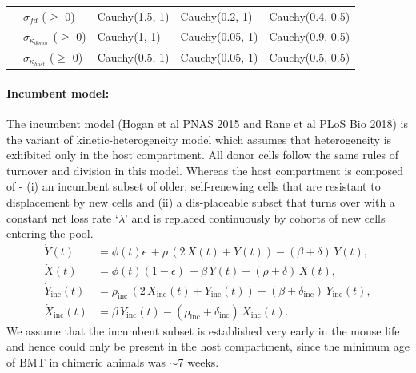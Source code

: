 \documentclass[11pt]{article}
\newcommand{\be}{\begin{equation}}
\newcommand{\ee}{\end{equation}}
\begin{document}
\begin{table}[h!]
\begin{center}
\begin{tabular}{l l l l l }
			&$\sigma_{fd}$ ($\ge$ 0)              & Cauchy(1.5, 1)        & Cauchy(0.2, 1)       &  Cauchy(0.4, 0.5)     \\
			&$\sigma_{\kappa_{donor}}$ ($\ge$ 0)  & Cauchy(1, 1)          & Cauchy(0.05, 1)      &  Cauchy(0.9, 0.5)     \\ 
			&$\sigma_{\kappa_{host}}$ ($\ge$ 0)   & Cauchy(0.5, 1)        & Cauchy(0.05, 1)      &  Cauchy(0.5, 0.5)     \\
			\hline
			\toprule 
		\end{tabular}
	\end{center}
\label{tab:priors_khm}
\end{table} 


\paragraph{Incumbent model:}
The incumbent model (Hogan et al PNAS 2015 and Rane et al PLoS Bio 2018) is the variant of kinetic-heterogeneity model which assumes that heterogeneity is exhibited only in the host compartment.
All donor cells follow the same rules of turnover and division in this model.
Whereas the host compartment is composed of - (i) an incumbent subset of older, self-renewing cells that are resistant to displacement by new cells and (ii) a dis-placeable subset that turns over with a constant net loss rate `$\lambda$' and is replaced continuously by cohorts of new cells entering the pool.
\be
\begin{aligned}
\dot Y(t) &= \phi(t) \epsilon \, + \rho \,(2 \, X(t) + Y(t)) - (\beta + \delta) \, Y(t),\\
\dot X(t) &= \phi(t) (1-\epsilon) \, + \beta  \, Y(t) - (\rho + \delta) \, X(t), \\
\dot Y_{\text{inc}}(t) &=  \rho_{\text{inc}} \,(2 \, X_{\text{inc}}(t) + Y_{\text{inc}}(t)) - (\beta + \delta_{\text{inc}}) \, Y_{\text{inc}}(t),\\
\dot X_{\text{inc}}(t) &=  \beta  \, Y_{\text{inc}}(t) - (\rho_{\text{inc}} + \delta_{\text{inc}}) \, X_{\text{inc}}(t).
\end{aligned}
\label{eq:INC}
\ee
We assume that the incumbent subset is established very early in the mouse life and hence could only be present in the host compartment, since the minimum age of BMT in chimeric animals was $\sim$7 weeks. 
\end{document}
